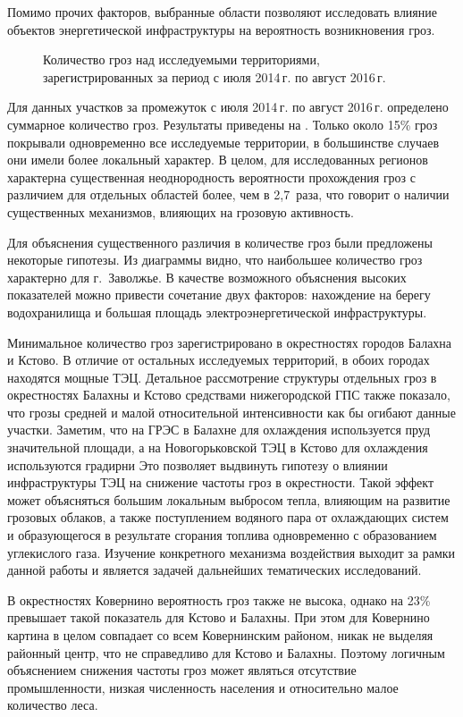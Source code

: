 Помимо прочих факторов, выбранные области позволяют исследовать влияние объектов энергетической инфраструктуры на вероятность возникновения гроз.

\begin{figure}[h]
	\caption{Количество гроз над исследуемыми территориями, зарегистрированных за период с июля 2014\,г. по август 2016\,г.}
	\label{fig:lds-places-stat}
\end{figure}

Для данных участков за промежуток с июля 2014\,г. по август 2016\,г. определено суммарное количество гроз. Результаты приведены на . Только около 15\% гроз покрывали одновременно все исследуемые территории, в большинстве случаев они имели более локальный характер. В целом, для исследованных регионов характерна существенная неоднородность вероятности прохождения гроз с различием для отдельных областей более, чем в 2,7~раза, что говорит о наличии существенных механизмов, влияющих на грозовую активность.

Для объяснения существенного различия в количестве гроз были предложены некоторые гипотезы. Из диаграммы видно, что наибольшее количество гроз характерно для г.~Заволжье. В качестве возможного объяснения высоких показателей можно привести сочетание двух факторов: нахождение на берегу водохранилища и большая площадь электроэнергетической инфраструктуры.

Минимальное количество гроз зарегистрировано в окрестностях городов Балахна и Кстово. В отличие от остальных исследуемых территорий, в обоих городах находятся мощные ТЭЦ. Детальное рассмотрение структуры отдельных гроз в окрестностях Балахны и Кстово средствами нижегородской ГПС также показало, что грозы средней и малой относительной интенсивности как бы огибают данные участки. Заметим, что на ГРЭС в Балахне для охлаждения используется пруд значительной площади, а на Новогорьковской ТЭЦ в Кстово для охлаждения используются градирни Это позволяет выдвинуть гипотезу о влиянии инфраструктуры ТЭЦ на снижение частоты гроз в окрестности. Такой эффект может объясняться большим локальным выбросом тепла, влияющим на развитие грозовых облаков, а также поступлением водяного пара от охлаждающих систем и образующегося в результате сгорания топлива одновременно с образованием углекислого газа. Изучение конкретного механизма воздействия выходит за рамки данной работы и является задачей дальнейших тематических исследований.

В окрестностях Ковернино вероятность гроз также не высока, однако на 23\% превышает такой показатель для Кстово и Балахны. При этом для Ковернино картина в целом совпадает со всем Ковернинским районом, никак не выделяя районный центр, что не справедливо для Кстово и Балахны. Поэтому логичным объяснением снижения частоты гроз может являться отсутствие промышленности, низкая численность населения и относительно малое количество леса.

